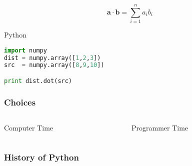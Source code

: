\documentclass[xcolor=table,10pt,final]{beamer}
\begin{document}
\begin{frame}[fragile]
  \frametitle{} %
  {\scriptsize
  \begin{equation*}
    \mathbf{a}\cdot\mathbf{b} = \sum_{i=1}^{n}a_ib_i
  \end{equation*}
}
\lstset{
      basicstyle=\footnotesize
    }
  \begin{block}{Python}
    \begin{lstlisting}[language=Python]
import numpy
dist = numpy.array([1,2,3])
src  = numpy.array([8,9,10])

print dist.dot(src)
\end{lstlisting}
\end{block}
\end{frame}

\begin{frame}
  \frametitle{Choices}
  \begin{columns}[c]
    \begin{column}{0.4\paperwidth}
      \begin{block}{Computer Time}
      \end{block}
    \end{column}
    \begin{column}{0.4\paperwidth}
      \begin{block}{Programmer Time}
      \end{block}
    \end{column}
  \end{columns}
\end{frame}


\begin{frame}
  \frametitle{History of Python}
\end{frame}
\end{document}

